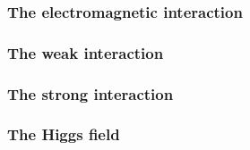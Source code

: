 
\subsubsection{The electromagnetic interaction} \label{sec:EMInteraction}


\subsubsection{The weak interaction} \label{sec:WeakInteraction}


\subsubsection{The strong interaction} \label{sec:StrongInteraction}


\subsubsection{The Higgs field} \label{sec:Higgs}
